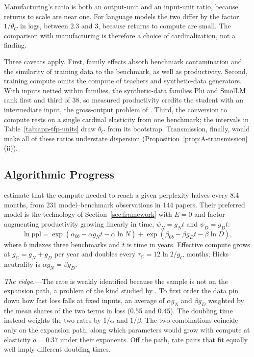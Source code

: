 Manufacturing's ratio is both an output-unit and an input-unit ratio, because returns to scale are near one. For
language models the two differ by the factor $1/\theta_C$ in logs, between 2.3 and 3, because returns to compute are
small. The comparison with manufacturing is therefore a choice of cardinalization, not a finding.



Three caveats apply. First, family effects absorb benchmark contamination and the similarity of training data to the
benchmark, as well as productivity. Second, training compute omits the compute of teachers and synthetic-data
generators. With inputs netted within families, the synthetic-data families Phi and SmolLM rank first and third of 38,
so measured productivity credits the student with an intermediate input, the gross-output problem of
\citet{gandhi2020identification}. Third, the conversion to compute rests on a single cardinal elasticity from one
benchmark; the intervals in Table~\ref{tab:app-tfp-units} draw $\theta_C$ from its bootstrap. Transmission, finally,
would make all of these ratios understate dispersion (Proposition~\ref{prop:A-transmission}(ii)).

\subsection{Algorithmic Progress}\label{app:obs-progress}

\citet{ho2024algorithmic} estimate that the compute needed to reach a given perplexity halves every 8.4 months, from 231
model--benchmark observations in 144 papers. Their preferred model is the technology of Section~\ref{sec:framework}
with $E=0$ and factor-augmenting productivity growing linearly in time, $\psi_N=g_Nt$ and $\psi_D=g_Dt$:
\[
\ln\text{ppl}=\exp(\alpha_{0b}-\alpha g_Nt-\alpha\ln N)+\exp(\beta_{0b}-\beta g_Dt-\beta\ln D),
\]
where $b$ indexes three benchmarks and $t$ is time in years. Effective compute grows at $g_C=g_N+g_D$ per year and
doubles every $\tau_C=12\ln2/g_C$ months; Hicks neutrality is $\alpha g_N=\beta g_D$.

\emph{The ridge.}---The rate is weakly identified because the sample is not on the expansion path, a problem of the kind
studied by \citet{diamond1978measurement}. To first order the data pin down how fast loss falls at fixed inputs, an
average of $\alpha g_N$ and $\beta g_D$ weighted by the mean shares of the two terms in loss (0.55 and 0.45). The
doubling time instead weights the two rates by $1/\alpha$ and $1/\beta$. The two combinations coincide only on the
expansion path, along which parameters would grow with compute at elasticity $a=0.37$ under their exponents. Off the
path, rate pairs that fit equally well imply different doubling times.

